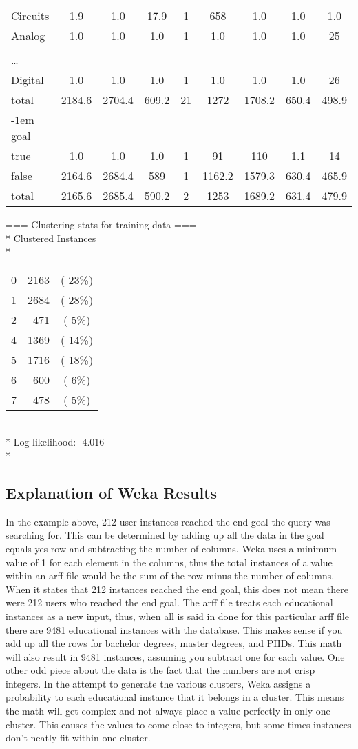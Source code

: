 \begin{tabular}{lcccccccc}
Circuits&1.9&1.0&17.9&1&658&1.0&1.0&1.0\\
Analog&1.0&1.0&1.0&1&1.0&1.0&1.0&25\\ 
\\ \ldots \\
Digital&1.0&1.0&1.0&1&1.0&1.0&1.0&26\\
total&2184.6&2704.4&609.2&21&1272&1708.2&650.4&498.9\\
\kern-1em goal\\ 
true&1.0&1.0&1.0&1&91&110&1.1&14\\
false&2164.6&2684.4&589&1&1162.2&1579.3&630.4&465.9\\ 
total&2165.6&2685.4&590.2&2&1253&1689.2&631.4&479.9\\
\end{tabular}
=== Clustering stats for training data ===\\*
Clustered Instances\\*
\begin{tabular}{lrc} 
0&2163&( 23\%)\\*
1&2684&( 28\%)\\*
2&471&(  5\%)\\*
4&1369&( 14\%)\\*
5&1716&( 18\%)\\*
6&600&(  6\%)\\*
7&478&(  5\%)\\*
\end{tabular}
\\*
\noindent Log likelihood: -4.016\\*

\subsection{Explanation of Weka Results}
In the example above, 212 user instances reached the end goal the query was
searching for.  This can be determined by adding up all the data in the goal equals yes
row and subtracting the number of columns.  Weka uses a minimum value of 1 for
each element in the columns, thus the total instances of a value within an arff
file would be the sum of the row minus the number of columns.  When it states that 212
instances reached the end goal, this does not mean there were 212 users who
reached the end goal.  The arff file treats each educational instances as a new
input, thus, when all is said in done for this particular arff file there are
9481 educational instances with the database.  This makes sense if you add up
all the rows for bachelor degrees, master degrees, and PHDs.  This math will
also result in 9481 instances, assuming you subtract one for each value.  One
other odd piece about the data is the fact that the numbers are not crisp
integers.  In the attempt to generate the various clusters, Weka assigns a
probability to each educational instance that it belongs in a cluster.  This
means the math will get complex and not always place a value perfectly in only
one cluster.  This causes the values to come close to integers, but some times
instances don't neatly fit within one cluster.

